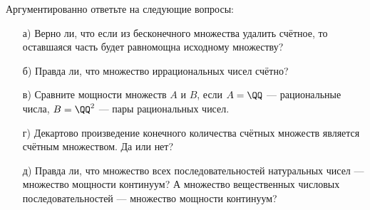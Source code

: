 \documentclass[12pt, a4paper, oneside]{article}
\begin{document}

\newpage

\begin{problem}{}
Аргументированно ответьте на следующие вопросы:

\begin{enumerate} 
    \item[а)] Верно ли, что если из бесконечного множества удалить счётное, то оставшаяся часть будет равномощна исходному множеству?
    \item[б)] Правда ли, что множество иррациональных чисел счётно?
    \item[в)] Сравните мощности множеств $A$ и $B$, если $A = \QQ$ --- рациональные числа, $B = \QQ^{2}$ --- пары рациональных чисел.
    \item[г)] Декартово произведение конечного количества счётных множеств
является счётным множеством. Да или нет?
    \item[д)] Правда ли, что множество всех последовательностей натуральных чисел --- множество мощности континуум? А множество вещественных числовых последовательностей --- множество мощности континуум?
\end{enumerate} 
\end{problem}
\end{document}

